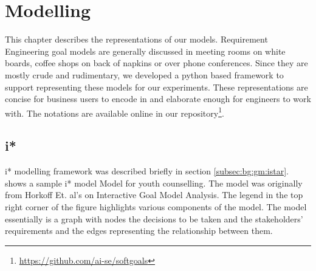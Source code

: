 \chapter{Modelling}
\label{chap:model}

This chapter describes the representations of our models. Requirement Engineering goal models are generally discussed in meeting rooms on white boards, coffee shops on back of napkins or over phone conferences. Since they are mostly crude and rudimentary, we developed a python based framework to support representing these models for our experiments. These representations are concise for business users to encode in and elaborate enough for engineers to work with. The notations are available online in our repository\footnote{\url{https://github.com/ai-se/softgoals}}.

\section{i*}
\label{sec:model:i*}

i* modelling framework was described briefly in section \ref{subsec:bg:gm:istar}. shows a sample i* model Model for youth counselling. The model was originally from Horkoff Et. al's \cite{horkoff12} on Interactive Goal Model Analysis. The legend in the top right corner of the figure highlights various components of the model. The model essentially is a graph with nodes the decisions to be taken and the stakeholders' requirements and the edges representing the relationship between them.

